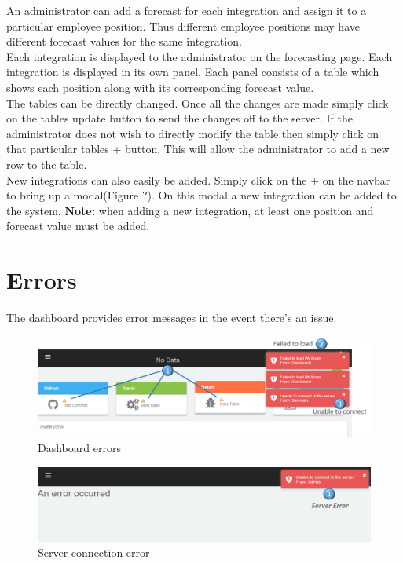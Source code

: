 \documentclass[11pt,a4paper]{article}
\begin{document}
An administrator can add a forecast for each integration and assign it to a particular employee position. Thus different employee positions may have different forecast values for the same integration. \\

Each integration is displayed to the administrator on the forecasting page. Each integration is displayed in its own panel. Each panel consists of a table which shows each position along with its corresponding forecast value. \\

The tables can be directly changed. Once all the changes are made simply click on the tables update button to send the changes off to the server. If the administrator does not wish to directly modify the table then simply click on that particular tables + button. This will allow the administrator to add a new row to the table. \\

New integrations can also easily be added. Simply click on the + on the navbar to bring up a modal(Figure ?). On this modal a new integration can be added to the system. \textbf{Note:} when adding a new integration, at least one position and forecast value must be added. 

\section{Errors}

The dashboard provides error messages in the event there's an issue.

\begin{figure}[H]
	\begin{center}
		\includegraphics[width=\linewidth]{../Images/Getting_Started/Dash_Error_numbered}
		\caption{Dashboard errors}
	\end{center}
\end{figure}

\begin{figure}[H]
	\begin{center}
		\includegraphics[width=\linewidth]{../Images/Getting_Started/Connect_Server_Detailed_numbered}
		\caption{Server connection error}
	\end{center}
\end{figure}
\end{document}
